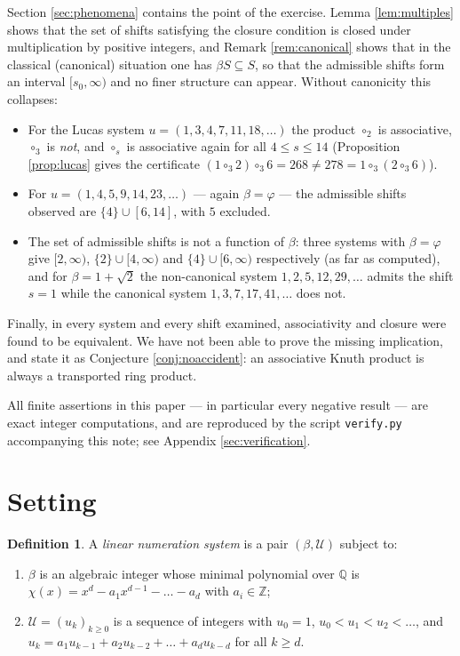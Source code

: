 \documentclass[11pt,reqno]{amsart}
\theoremstyle{plain}
\theoremstyle{definition}
\newtheorem{definition}[theorem]{Definition}
\newcommand{\Z}{\mathbb{Z}}
\newcommand{\Q}{\mathbb{Q}}
\newcommand{\Uu}{\mathcal{U}}
\begin{document}
Section \ref{sec:phenomena} contains the point of the exercise. Lemma \ref{lem:multiples} shows that
the set of shifts satisfying the closure condition is closed under multiplication by positive
integers, and Remark \ref{rem:canonical} shows that in the classical (canonical) situation one has
$\beta S\subseteq S$, so that the admissible shifts form an interval $[s_{0},\infty)$ and no finer
structure can appear. Without canonicity this collapses:

\begin{itemize}
\item For the Lucas system $u=(1,3,4,7,11,18,\dots)$ the product $\circ_{2}$ is associative,
      $\circ_{3}$ is \emph{not}, and $\circ_{s}$ is associative again for all $4\le s\le14$
      (Proposition \ref{prop:lucas} gives the certificate
      $(1\circ_{3}2)\circ_{3}6=268\ne278=1\circ_{3}(2\circ_{3}6)$).
\item For $u=(1,4,5,9,14,23,\dots)$ --- again $\beta=\varphi$ --- the admissible shifts observed are
      $\{4\}\cup[6,14]$, with $5$ excluded.
\item The set of admissible shifts is not a function of $\beta$: three systems with $\beta=\varphi$
      give $[2,\infty)$, $\{2\}\cup[4,\infty)$ and $\{4\}\cup[6,\infty)$ respectively (as far as
      computed), and for $\beta=1+\sqrt2$ the non-canonical system $1,2,5,12,29,\dots$ admits the
      shift $s=1$ while the canonical system $1,3,7,17,41,\dots$ does not.
\end{itemize}

Finally, in every system and every shift examined, associativity and closure were found to be
equivalent. We have not been able to prove the missing implication, and state it as Conjecture
\ref{conj:noaccident}: an associative Knuth product is always a transported ring product.

All finite assertions in this paper --- in particular every negative result --- are exact integer
computations, and are reproduced by the script \texttt{verify.py} accompanying this note; see
Appendix \ref{sec:verification}.

\section{Setting}

\begin{definition}\label{def:system}
A \emph{linear numeration system} is a pair $(\beta,\Uu)$ subject to:
\begin{enumerate}
\item[(H1)] $\beta$ is an algebraic integer whose minimal polynomial over $\Q$ is
      $\chi(x)=x^{d}-a_{1}x^{d-1}-\dots-a_{d}$ with $a_{i}\in\Z$;
\item[(H2)] $\Uu=(u_{k})_{k\ge0}$ is a sequence of integers with $u_{0}=1$,
      $u_{0}<u_{1}<u_{2}<\dots$, and
      $u_{k}=a_{1}u_{k-1}+a_{2}u_{k-2}+\dots+a_{d}u_{k-d}$ for all $k\ge d$.
\end{enumerate}
\end{definition}
\end{document}
